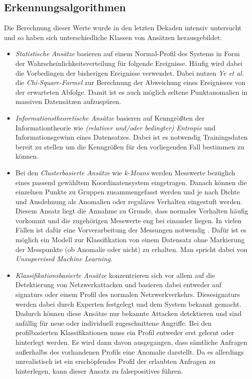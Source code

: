 \subsection{Erkennungsalgorithmen}
Die Berechnung dieser Werte wurde in den letzten Dekaden intensiv untersucht und so haben sich unterschiedliche Klassen von Ansätzen herausgebildet\cite{ahmed2016survey}:
\begin{itemize}
\item \textit{Statistische Ansätze} basieren auf einem Normal-Profil des Systems in Form der Wahrscheinlichkeitsverteilung für folgende Ereignisse. Häufig wird dabei die Vorbedingen der bisherigen Ereignisse verwendet. Dabei nutzen \textit{Ye et al.} \cite{ye2001anomaly} die \textit{Chi-Square-Formel} zur Berechnung der Abweichung eines Ereignisses von der erwarteten Abfolge. Damit ist es auch möglich seltene Punktanomalien in massiven Datensätzen aufzuspüren.
\item \textit{Informationstheoretische Ansätze} basieren auf Kenngrößten der Informationtheorie wie \textit{(relativer und/oder bedingter) Entropie} und Informationsgewinn eines Datensatzes. Dabei ist es notwendig Trainingsdaten bereit zu stellen um die Kenngrößen für den vorliegenden Fall bestimmen zu können. \cite{noble2003graph}
\item Bei den \textit{Clusterbasierte Ansätze} wie \textit{k-Means}\cite{likas2003global} werden Messwerte bezüglich eines passend gewähltem Koordinatensystem eingetragen. Danach können die einzelnen Punkte zu Gruppen zusammengefasst werden und je nach Dichte und Ausdehnung als Anomalien oder reguläres Verhalten eingestuft werden. Diesem Ansatz liegt die Annahme zu Grunde, dass normales Verhalten häufig vorkommt und die zugehörigen Messwerte eng bei einander liegen. In vielen Fällen ist dafür eine Vorverarbeitung der Messungen notwendig \cite{munz2007traffic}. Dafür ist es möglich ein Modell zur Klassifikation von einem Datensatz ohne Markierung der Messpunkte (ob Anomalie oder nicht) zu erhalten. Man spricht dabei von \textit{Unsupervised Machine Learning}\cite{munz2007traffic}.
\item \textit{Klassifikationsbasierte Ansätze} konzentrieren sich vor allem auf die Detektierung von Netzwerkattacken und basieren dabei entweder auf \Glspl{signatur} oder einem Profil des normalen Netzwerkverkehrs. Diese\Glspl{signatur} werden dabei durch Experten festgelegt und dem System bekannt gemacht. Dadurch können diese Ansätze nur bekannte Attacken detektieren und sind anfällig für neue oder individuell zugeschnittene Angriffe. Bei den profilbasierten Klassifikationen muss ein Profil entweder erst gelernt oder hinterlegt werden. Es wird dann davon ausgegangen, dass sämtliche Anfragen außerhalbs des vorhandenen Profils eine Anomalie darstellt. Da es allerdings unrealistisch ist ein erschöpfendes Profil der erlaubten Anfragen zu hinterlegen, kann dieser Ansatz zu \Glspl{falsepositive} führen. 
\end{itemize}
